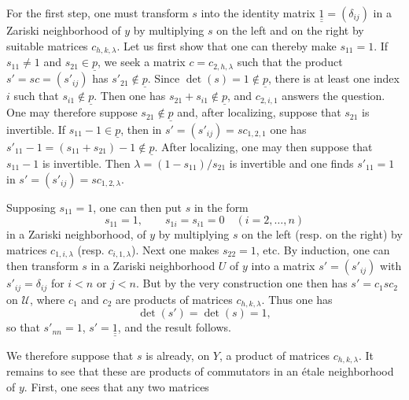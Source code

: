 For the first step, one must transform \(s\) into the identity matrix \(\underline{\underline{1}}=(\delta_{ij})\) in a Zariski neighborhood of \(y\) by multiplying \(s\) on the left and on the right by suitable matrices \(c_{h,k,\lambda}\). Let us first show that one can thereby make \(s_{11}=1\). If \(s_{11}\ne1\) and \(s_{21}\in\underline{p}\), we seek a matrix \(c=c_{2,h,\lambda}\) such that the product \(s'=sc=(s'_{ij})\) has \(s'_{21}\notin\underline{p}\). Since \(\det(s)=1\notin\underline{p}\), there is at least one index \(i\) such that \(s_{i1}\notin\underline{p}\). Then one has \(s_{21}+s_{i1}\notin\underline{p}\), and \(c_{2,i,1}\) answers the question. One may therefore suppose \(s_{21}\notin\underline{p}\) and, after localizing, suppose that \(s_{21}\) is invertible. If \(s_{11}-1\in\underline{p}\), then in \(s'=(s'_{ij})=sc_{1,2,1}\) one has
\(s'_{11}-1=(s_{11}+s_{21})-1\notin\underline{p}\). After localizing, one may then suppose that \(s_{11}-1\) is invertible. Then \(\lambda=(1-s_{11})/s_{21}\) is invertible and one finds \(s'_{11}=1\) in \(s'=(s'_{ij})=sc_{1,2,\lambda}\).

Supposing \(s_{11}=1\), one can then put \(s\) in the form
\[
 s_{11}=1,\qquad s_{1i}=s_{i1}=0\quad(i=2,\ldots,n)
\]
in a Zariski neighborhood, of \(y\) by multiplying \(s\) on the left (resp. on the right) by matrices \(c_{1,i,\lambda}\) (resp. \(c_{i,1,\lambda}\)). Next one makes \(s_{22}=1\), etc. By induction, one can then transform \(s\) in a Zariski neighborhood \(U\) of \(y\) into a matrix \(s'=(s'_{ij})\) with \(s'_{ij}=\delta_{ij}\) for \(i<n\) or \(j<n\). But by the very construction one then has \(s'=c_1sc_2\) on \(\mathcal U\), where \(c_1\) and \(c_2\) are products of matrices \(c_{h,k,\lambda}\). Thus one has
\[
 \det(s')=\det(s)=1,
\]
so that \(s'_{nn}=1\), \(s'=\underline{\underline{1}}\), and the result follows.

We therefore suppose that \(s\) is already, on \(Y\), a product of matrices \(c_{h,k,\lambda}\).
It remains to see that these are products of commutators in an étale neighborhood of \(y\). First, one sees that any two matrices

%

